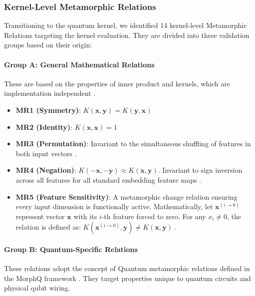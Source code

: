 \documentclass[12pt,a4paper]{article}
\begin{document}
	\subsubsection{Kernel-Level Metamorphic Relations}
	\label{sec:kernel_mrs}
	
	Transitioning to the quantum kernel, we identified 14 kernel-level Metamorphic Relations targeting the kernel evaluation. They are divided into three validation groups based on their origin:
	
	\paragraph{Group A: General Mathematical Relations}
	These are based on the properties of inner product and kernels, which are implementation independent \cite{schuld2019}.
	\begin{itemize}
		\item \textbf{MR1 (Symmetry)}: $K(\mathbf{x},\mathbf{y}) = K(\mathbf{y},\mathbf{x})$ 
		\item \textbf{MR2 (Identity)}: $K(\mathbf{x},\mathbf{x}) = 1$
		\item \textbf{MR3 (Permutation)}: Invariant to the simultaneous shuffling of features in both input vectors \cite{xie2011}.
		\item \textbf{MR4 (Negation)}: $K(-\mathbf{x},-\mathbf{y}) \approx K(\mathbf{x},\mathbf{y})$. Invariant to sign inversion across all features for all standard embedding feature maps \cite{xie2011}.
		\item \textbf{MR5 (Feature Sensitivity)}: A metamorphic change relation ensuring every input dimension is functionally active. Mathematically, let $\mathbf{x}^{(i \to 0)}$ represent vector $\mathbf{x}$ with its $i$-th feature forced to zero. For any $x_i \neq 0$, the relation is defined as: $K(\mathbf{x}^{(i \to 0)}, \mathbf{y}) \neq K(\mathbf{x}, \mathbf{y})$ \cite{Segura2016}.
	\end{itemize}
	
	\paragraph{Group B: Quantum-Specific Relations}
	These relations adopt the concept of Quantum metamorphic relations defined in the MorphQ framework \cite{Paltenghi2023}. They target properties unique to quantum circuits and physical qubit wiring.
	
\end{document}
